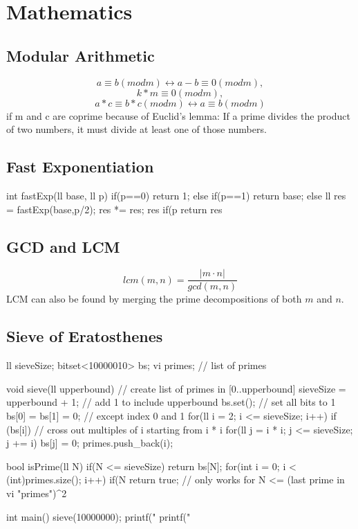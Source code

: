 \documentclass{article}
\begin{document}
\section{Mathematics}
\subsection{Modular Arithmetic}
\[ a \equiv b (mod m) \leftrightarrow a - b \equiv 0 (mod m),\]
\[k * m \equiv 0 (mod m),\]
\[a * c \equiv b * c (mod m) \leftrightarrow a \equiv b (mod m)\]
if m and c are coprime because of Euclid’s lemma: If a prime divides the product of two numbers, it must divide at least one of those numbers.
\subsection{Fast Exponentiation}
\begin{mylisting}{}
int fastExp(ll base, ll p){
	if(p==0) return 1;
	else if(p==1) return base;
	else{
		ll res = fastExp(base,p/2);
		res *= res;
		res %
		if(p%
		return res%
		}
}
\end{mylisting}

\subsection{GCD and LCM}

\[lcm(m,n)=\frac{|m \cdot n|}{gcd(m,n)}\]
LCM can also be found by merging the prime decompositions of both \(m\) and \(n\). 

\subsection{Sieve of Eratosthenes}
\begin{mylisting}{}
ll sieveSize;
bitset<10000010> bs;
vi primes; // list of primes

void sieve(ll upperbound){	// create list of primes in [0..upperbound]
	sieveSize = upperbound + 1;	// add 1 to include upperbound
	bs.set();	// set all bits to 1
	bs[0] = bs[1] = 0;	// except index 0 and 1
	for(ll i = 2; i <= sieveSize; i++) if (bs[i]){
		// cross out multiples of i starting from i * i
		for(ll j = i * i; j <= sieveSize; j += i) bs[j] = 0;
		primes.push_back(i);
}}
	
bool isPrime(ll N){	
	if(N <= sieveSize) return bs[N];
	for(int i = 0; i < (int)primes.size(); i++)
		if(N %
	return true;
}	// only works for N <= (last prime in vi "primes")^2

int main(){
	sieve(10000000);
	printf("%
	printf("%
}
\end{mylisting}
\end{document}
